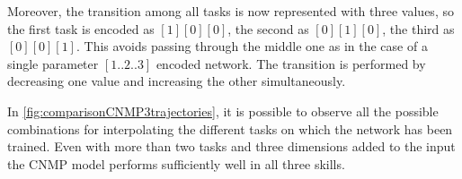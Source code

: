 Moreover, the transition among all tasks is now represented with three values, so the first task is encoded as $[1][0][0]$, the second as $[0][1][0]$, the third as $[0][0][1]$. This avoids passing through the middle one as in the case of a single parameter $[1..2..3]$ encoded network. The transition is performed by decreasing one value and increasing the other simultaneously.


In \cref{fig:comparisonCNMP3trajectories}, it is possible to observe all the possible combinations for interpolating the different tasks on which the network has been trained. Even with more than two tasks and three dimensions added to the input the CNMP model performs sufficiently well in all three skills. 

